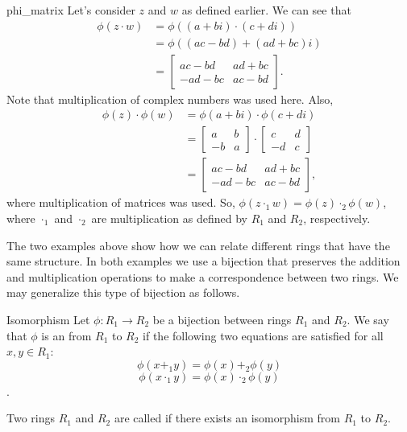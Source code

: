 \begin{example}{phi_matrix}
Let's consider $z$ and $w$ as defined earlier.  We can see that
\begin{align*}
\phi(z\cdot w)&=\phi((a+bi)\cdot(c+di))\\
&=\phi((ac-bd)+(ad+bc)i)\\
&=
\begin{bmatrix}
ac-bd & ad+bc\\
-ad-bc & ac-bd
\end{bmatrix}.
\end{align*}
Note that multiplication of complex numbers was used here.  Also,
\begin{align*}
\phi(z)\cdot\phi(w)&=\phi(a+bi)\cdot\phi(c+di)\\
&=
\begin{bmatrix}
a & b\\
-b & a
\end{bmatrix}\cdot
\begin{bmatrix}
c & d\\
-d & c
\end{bmatrix}\\
&=
\begin{bmatrix}
ac-bd & ad+bc\\
-ad-bc & ac-bd
\end{bmatrix}, 
\end{align*}
where multiplication of matrices was used.  So, $\phi(z\cdot_1 w)=\phi(z)\cdot_2\phi(w)$, where $\cdot_1$ and $\cdot_2$ are multiplication as defined by $R_1$ and $R_2$, respectively.   
\end{example}
The two examples above show how we can relate different rings that have the same structure. In both examples we use a bijection that preserves the addition and multiplication operations to make a correspondence between two rings. We may generalize this type of bijection as follows.

\begin{defn}{Isomorphism}
Let $\phi:R_1\rightarrow R_2$ be a bijection between rings $R_1$ and $R_2$.  We say that $\phi$ is an  from $R_1$ to $R_2$ if the following two equations are satisfied for all $x,y\in R_1$:
\begin{equation}\label{iso_add}
\phi(x+_1y)=\phi(x)+_2\phi(y)
\end{equation}
\begin{equation}\label{iso_mult}
\phi(x\cdot_1y)=\phi(x)\cdot_2\phi(y)
\end{equation}.

Two rings $R_1$ and $R_2$ are called  if there exists an isomorphism from $R_1$ to $R_2$.
\end{defn}

